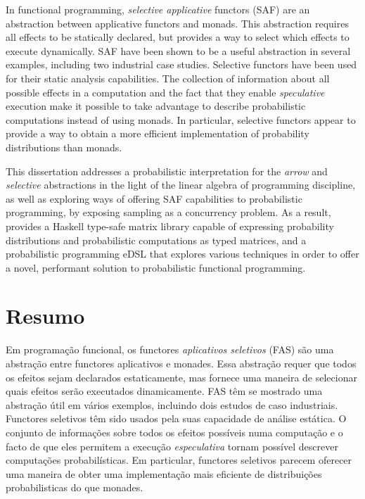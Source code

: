 \documentclass[
  oneside,
  11pt, a4paper,
  footinclude=true,
  headinclude=true,
  cleardoublepage=empty
]{scrbook}
\theoremstyle{definition}
\theoremstyle{definition}
\begin{document}
    In functional programming, \emph{selective applicative} functors (SAF) are an abstraction between applicative functors and monads. This abstraction requires all effects to be statically declared, but provides a way to select which effects to execute dynamically. SAF have been shown to be a useful abstraction in several examples, including two industrial case studies. Selective functors have been used for their static analysis capabilities. The collection of information about all possible effects in a computation and the fact that they enable \emph{speculative} execution make it possible to take advantage to describe probabilistic computations instead of using monads. In particular, selective functors appear to provide a way to obtain a more efficient implementation of probability distributions than monads.
    
    This dissertation addresses a probabilistic interpretation for the \emph{arrow} and \emph{selective} abstractions in the light of the linear algebra of programming discipline, as well as exploring ways of offering SAF capabilities to probabilistic programming, by exposing sampling as a concurrency problem. As a result, provides a Haskell type-safe matrix library capable of expressing probability distributions and probabilistic computations as typed matrices, and a probabilistic programming eDSL that explores various techniques in order to offer a novel, performant solution to probabilistic functional programming.
	
	\vskip0.5cm
	
	\cleardoublepage
	\chapter*{Resumo}
	
    Em programação funcional, os functores \emph{aplicativos seletivos} (FAS) são uma abstração entre functores aplicativos e monades. Essa abstração requer que todos os efeitos sejam declarados estaticamente, mas fornece uma maneira de selecionar quais efeitos serão executados dinamicamente. FAS têm se mostrado uma abstração útil em vários exemplos, incluindo dois estudos de caso industriais. Functores seletivos têm sido usados pela suas capacidade de análise estática. O conjunto de informações sobre todos os efeitos possíveis numa computação e o facto de que eles permitem a execução \emph{especulativa} tornam possível descrever computações probabilísticas. Em particular, functores seletivos parecem oferecer uma maneira de obter uma implementação mais eficiente de distribuições probabilisticas do que monades.
        
\end{document}
